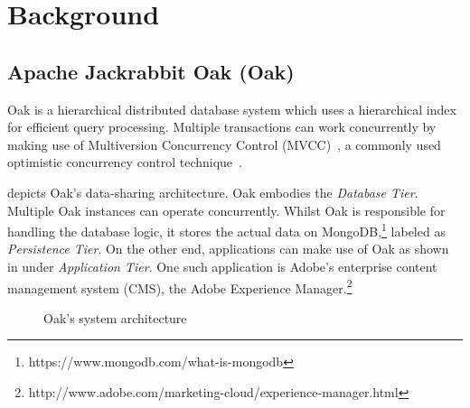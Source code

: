 \documentclass[abstracton,12pt]{scrartcl}
\theoremstyle{definition}
\begin{document}
\section{Background}

\subsection{Apache Jackrabbit Oak (Oak)}

Oak is a hierarchical distributed database system which uses a
hierarchical index for efficient query processing. Multiple transactions can
work concurrently by making use of
Multiversion Concurrency Control (MVCC)~\cite{GW02}, a commonly used optimistic
concurrency control technique~\cite{TM11}.

 depicts Oak's data-sharing architecture. Oak embodies the
\textit{Database Tier}. Multiple Oak instances can operate concurrently.
Whilst Oak is responsible for handling the database logic, it stores the actual
data on MongoDB,\footnote{https://www.mongodb.com/what-is-mongodb} labeled as
\textit{Persistence Tier}. On the other end, applications can make use of Oak as
shown in  under \textit{Application Tier}.
One such application is Adobe's enterprise content management system (CMS),
the Adobe Experience
Manager.\footnote{http://www.adobe.com/marketing-cloud/experience-manager.html}

\begin{figure}[h]
  \centering
  \caption{Oak's system architecture}
  \label{fig:architecture}
\end{figure}
\end{document}
